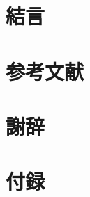 \documentclass[a4j,12pt]{jsarticle}
\begin{document}
\newpage
\section{結言}

\section{参考文献}

\section{謝辞}

\section{付録}
\end{document}
